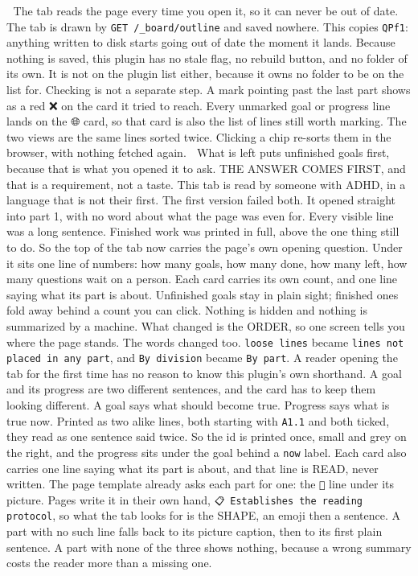 📌 The tab reads the page every time you open it, so it can never be out of date. The tab is drawn by \texttt{GET /\_board/outline} and saved nowhere. This copies \texttt{QPf1}: anything written to disk starts going out of date the moment it lands. Because nothing is saved, this plugin has no stale flag, no rebuild button, and no folder of its own. It is not on the plugin list either, because it owns no folder to be on the list for. Checking is not a separate step. A mark pointing past the last part shows as a red ❌ on the card it tried to reach. Every unmarked goal or progress line lands on the 🌐 card, so that card is also the list of lines still worth marking. The two views are the same lines sorted twice. Clicking a chip re-sorts them in the browser, with nothing fetched again. 🚦 What is left puts unfinished goals first, because that is what you opened it to ask. THE ANSWER COMES FIRST, and that is a requirement, not a taste. This tab is read by someone with ADHD, in a language that is not their first. The first version failed both. It opened straight into part 1, with no word about what the page was even for. Every visible line was a long sentence. Finished work was printed in full, above the one thing still to do. So the top of the tab now carries the page's own opening question. Under it sits one line of numbers: how many goals, how many done, how many left, how many questions wait on a person. Each card carries its own count, and one line saying what its part is about. Unfinished goals stay in plain sight; finished ones fold away behind a count you can click. Nothing is hidden and nothing is summarized by a machine. What changed is the ORDER, so one screen tells you where the page stands. The words changed too. \texttt{loose lines} became \texttt{lines not placed in any part}, and \texttt{By division} became \texttt{By part}. A reader opening the tab for the first time has no reason to know this plugin's own shorthand. A goal and its progress are two different sentences, and the card has to keep them looking different. A goal says what should become true. Progress says what is true now. Printed as two alike lines, both starting with \texttt{A1.1} and both ticked, they read as one sentence said twice. So the id is printed once, small and grey on the right, and the progress sits under the goal behind a \texttt{now} label. Each card also carries one line saying what its part is about, and that line is READ, never written. The page template already asks each part for one: the \texttt{📌} line under its picture. Pages write it in their own hand, \texttt{📋 Establishes the reading protocol}, so what the tab looks for is the SHAPE, an emoji then a sentence. A part with no such line falls back to its picture caption, then to its first plain sentence. A part with none of the three shows nothing, because a wrong summary costs the reader more than a missing one.


